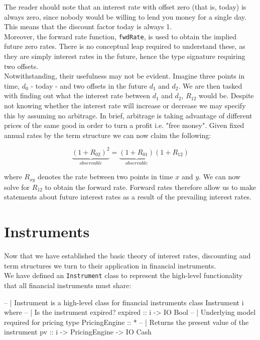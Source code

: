 The reader should note that an interest rate with offset zero (that is, today) is
always zero, since nobody would be willing to lend you money for a single day.
This means that the discount factor today is always 1.\\

Moreover, the forward rate function, \texttt{fwdRate}, is used to obtain the 
implied future zero rates. There is no conceptual leap required to understand 
these, as they are simply interest rates in the future, hence the type 
signature requiring two offsets.\\

Notwithstanding, their usefulness may not be evident. 
Imagine three points in time, $d_0$ - today - and two
offsets in the future $d_1$ and $d_2$. We are then tasked with finding out
what the interest rate between $d_1$ and $d_2$, $R_{12}$ would be. Despite not 
knowing whether the interest rate will increase or decrease we may specify 
this by assuming no arbitrage. In brief, arbitrage is taking advantage of
different prices of the same good in order to turn a profit i.e. "free money".
Given fixed annual rates by the term structure we can now claim the following:

\begin{equation}
\underbrace{(1+R_{02})^2}_{observable} = \underbrace{(1+R_{01})}_{observable}(1 + R_{12})
\end{equation}

where $R_{xy}$ denotes the rate between two points in time $x$ and $y$. We
can now solve for $R_{12}$ to obtain the forward rate. Forward rates therefore
allow us to make statements about future interest rates as a result of the
prevailing interest rates.

\section{Instruments}\label{sec:instruments}

Now that we have established the basic theory of interest rates, discounting
and term structures we turn to their application in financial instruments.\\

We have defined an \texttt{Instrument} class to represent the high-level
functionality that all financial instruments must share:

\begin{hscode}
-- | Instrument is a high-level class for financial instruments
class Instrument i where
  -- | Is the instrument expired?
  expired :: i -> IO Bool
  -- | Underlying model required for pricing
  type PricingEngine :: *
  -- | Returns the present value of the instrument
  pv :: i -> PricingEngine -> IO Cash
\end{hscode}

